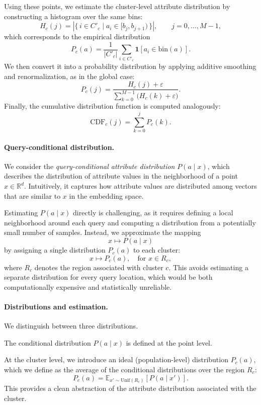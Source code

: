 Using these points, we estimate the cluster-level attribute distribution by
constructing a histogram over the same bins:
\[
H_c(j)
=
\left|
\{\, i \in C'_c \mid a_i \in [b_j, b_{j+1}) \,\}
\right|,
\qquad j=0,\dots,M-1,
\]
which corresponds to the empirical distribution
\[
P_c(a) = \frac{1}{|C'_c|} \sum_{i \in C'_c} \mathbf{1}[a_i \in \text{bin}(a)].
\]
We then convert it into a probability distribution by applying additive
smoothing and renormalization, as in the global case:
\[
P_c(j)
=
\frac{H_c(j) + \varepsilon}
{\sum_{k=0}^{M-1} \bigl(H_c(k) + \varepsilon\bigr)}.
\]
Finally, the cumulative distribution function is computed analogously:
\[
\mathrm{CDF}_c(j)
=
\sum_{k=0}^{j} P_c(k).
\]

\paragraph{Query-conditional distribution.}
We consider the \emph{query-conditional attribute distribution}
\(P(a \mid x)\), which describes the distribution of attribute values in the
neighborhood of a point \(x \in \mathbb{R}^d\). Intuitively, it captures how
attribute values are distributed among vectors that are similar to \(x\) in the
embedding space.

Estimating \(P(a \mid x)\) directly is challenging, as it requires defining a
local neighborhood around each query and computing a distribution from a
potentially small number of samples. Instead, we approximate the mapping
\[
x \mapsto P(a \mid x)
\]
by assigning a single distribution \(P_c(a)\) to each cluster:
\[
x \mapsto P_c(a), \quad \text{for } x \in R_c,
\]
where \(R_c\) denotes the region associated with cluster \(c\). This avoids
estimating a separate distribution for every query location, which would be
both computationally expensive and statistically unreliable.

\paragraph{Distributions and estimation.}
We distinguish between three distributions. 

The conditional distribution
\(P(a \mid x)\) is defined at the point level. 

At the cluster level, we
introduce an ideal (population-level) distribution \(P_c(a)\), which we define
as the average of the conditional distributions over the region \(R_c\):
\[
P_c(a) = \mathbb{E}_{x' \sim \mathrm{Unif}(R_c)}[P(a \mid x')].
\]
This provides a clean abstraction of the attribute distribution associated
with the cluster.

